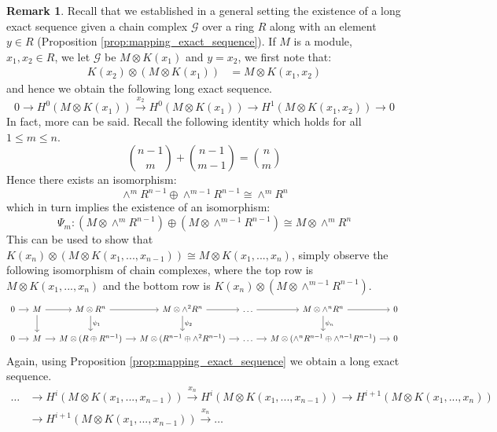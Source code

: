 \documentclass[12pt]{article}
\theoremstyle{plain}
\theoremstyle{definition}
\newtheorem{remark}[thm]{Remark}
\newcommand{\scr}[1]{\mathscr{#1}}
\newcommand{\lto}{\longrightarrow}
\begin{document}
\begin{remark}\label{rmk:long_exact_sequence}
Recall that we established in a general setting the existence of a long exact sequence given a chain complex $\scr{G}$ over a ring $R$ along with an element $y \in R$ (Proposition \ref{prop:mapping_exact_sequence}). If $M$ is a module, $x_1,x_2 \in R$, we let $\scr{G}$ be $M \otimes K(x_1)$ and $y = x_2$, we first note that:
\begin{align*}
    K(x_2) \otimes (M \otimes K(x_1)) &= M \otimes K(x_1,x_2)
\end{align*}
and hence we obtain the following long exact sequence.
\begin{equation}
    0 \lto H^0(M \otimes K(x_1)) \stackrel{x_2}{\lto} H^0(M \otimes K(x_1)) \lto H^1(M \otimes K(x_1,x_2)) \lto 0
\end{equation}
In fact, more can be said. Recall the following identity which holds for all $1 \leq m \leq n$.
\begin{equation}
    {n-1 \choose m} + {n-1 \choose m-1} = {n \choose m}
\end{equation}
Hence there exists an isomorphism:
\begin{equation}
    \wedge^{m}R^{n-1} \oplus \wedge^{m-1}R^{n-1} \cong \wedge^m R^n
\end{equation}
which in turn implies the existence of an isomorphism:
\begin{equation}
    \Psi_m: (M \otimes \wedge^{m}R^{n-1}) \oplus (M \otimes \wedge^{m-1}R^{n-1}) \cong M \otimes \wedge^mR^n
\end{equation}
This can be used to show that $K(x_n) \otimes (M \otimes K(x_1,...,x_{n-1})) \cong M \otimes K(x_1,...,x_n)$, simply observe the following isomorphism of chain complexes, where the top row is $M \otimes K(x_1,...,x_n)$ and the bottom row is $K(x_n) \otimes (M \otimes \wedge^{m-1}R^{n-1})$.
\begin{equation}
    \begin{tikzcd}[column sep = small]
    0\arrow[r] & M\arrow[r]\arrow[d] & M \otimes R^{n}\arrow[r]\arrow[d,"{\psi_1}"] & M \otimes \wedge^2 R^n\arrow[r]\arrow[d,"{\psi_2}"] & \hdots\arrow[r] & M \otimes \wedge^n R^n\arrow[r]\arrow[d,"{\psi_n}"] & 0\\
    0\arrow[r] & M\arrow[r] & M\otimes(R \oplus R^{n-1} )\arrow[r] & M \otimes ( R^{n-1} \oplus \wedge^2 R^{n-1})\arrow[r] & \hdots\arrow[r] & M \otimes (\wedge^{n}R^{n-1} \oplus \wedge^{n-1}R^{n-1})\arrow[r] & 0
    \end{tikzcd}
\end{equation}
Again, using Proposition \ref{prop:mapping_exact_sequence} we obtain a long exact sequence.
\begin{align*}
    \hdots &\lto H^i(M \otimes K(x_1,...,x_{n-1})) \stackrel{x_n}{\lto} H^i(M \otimes K(x_1,...,x_{n-1})) \lto H^{i+1}(M \otimes K(x_1,...,x_n))\\
    &\lto H^{i+1}(M \otimes K(x_1,...,x_{n-1})) \stackrel{x_n}{\lto} \hdots
\end{align*}
\end{remark}
\end{document}
